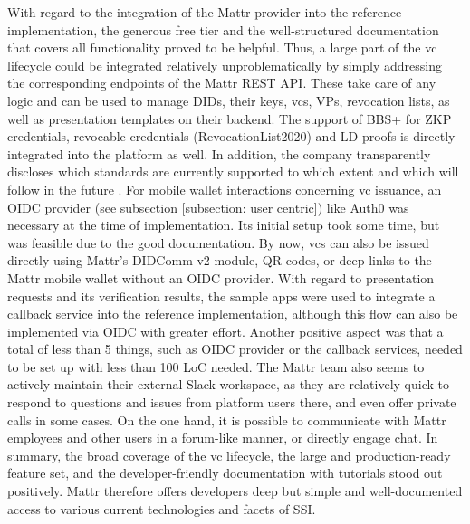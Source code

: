         With regard to the integration of the Mattr provider into the reference implementation, the generous free tier and the well-structured documentation that covers all functionality proved to be helpful. Thus, a large part of the \ac{vc} lifecycle could be integrated relatively unproblematically by simply addressing the corresponding endpoints of the Mattr REST API. These take care of any logic and can be used to manage \acp{DID}, their keys, \acp{vc}, \acp{VP}, revocation lists, as well as presentation templates on their backend. The support of BBS+ for \ac{ZKP} credentials, revocable credentials (RevocationList2020) and LD proofs is directly integrated into the platform as well. In addition, the company transparently discloses which standards are currently supported to which extent and which will follow in the future \cite{mattr_supported_2021, mattr_upcoming_2021}. For mobile wallet interactions concerning \ac{vc} issuance, an \ac{OIDC} provider (see subsection \ref{subsection: user centric}) like Auth0 was necessary at the time of implementation. Its initial setup took some time, but was feasible due to the good documentation. By now, \acp{vc} can also be issued directly using Mattr's DIDComm v2 module, QR codes, or deep links to the Mattr mobile wallet without an \ac{OIDC} provider. With regard to presentation requests and its verification results, the sample apps were used to integrate a callback service into the reference implementation, although this flow can also be implemented via \ac{OIDC} with greater effort. Another positive aspect was that a total of less than 5 things, such as OIDC provider or the callback services, needed to be set up with less than 100 LoC needed. The Mattr team also seems to actively maintain their external Slack workspace, as they are relatively quick to respond to questions and issues from platform users there, and even offer private calls in some cases. On the one hand, it is possible to communicate with Mattr employees and other users in a forum-like manner, or directly engage chat. In summary, the broad coverage of the \ac{vc} lifecycle, the large and production-ready feature set, and the developer-friendly documentation with tutorials stood out positively. Mattr therefore offers developers deep but simple and well-documented access to various current technologies and facets of \ac{SSI}.
    
